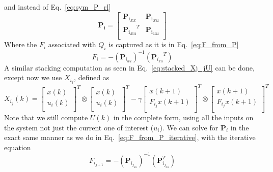 and instead of Eq.~\ref{eq:sym_P_rl}
\begin{equation}
    \textbf{P}_\textbf{i}=\left[\begin{matrix}{\textbf{P}_\textbf{i}}_{xx}&{\textbf{P}_\textbf{i}}_{xu}\\{{\textbf{P}_\textbf{i}}_{xu}}^T&{\textbf{P}_\textbf{i}}_{uu}\\\end{matrix}\right]
    \label{eq:Pi_matrix}
\end{equation}
Where the $F_i$ associated with $Q_i$ is captured as it is in Eq.~\ref{eq:F_from_P}
\begin{equation}
    F_i=-{\left(\textbf{P}_{i_{uu}}\right)}^{-1}\left({\textbf{P}_{i_{xu}}}^T\right)
    \label{eq:Fi_from_Pi}
\end{equation}
A similar stacking computation as seen in Eq.~\ref{eq:stacked_Xj_jU} can be done, except now we use $X_{i_j}$, defined as
\begin{equation}
    X_{i_j}(k)={\left[\begin{matrix}x\left(k\right)\\u_i\left(k\right)\\\end{matrix}\right]}^T\otimes{\left[\begin{matrix}x\left(k\right)\\u_i\left(k\right)\\\end{matrix}\right]}^T-{\gamma\left[\begin{matrix}x\left(k+1\right)\\F_{i_j}x\left(k+1\right)\\\end{matrix}\right]}^T\otimes{\left[\begin{matrix}x\left(k+1\right)\\F_{i_j}x\left(k+1\right)\\\end{matrix}\right]}^T
    \label{eq:Xij}
\end{equation}
Note that we still compute $U\left(k\right)$ in the complete form, using all the inputs on the system not just the current one of interest ($u_i$). We can solve for $\textbf{P}_i$ in the exact same manner as we do in Eq.~\ref{eq:F_from_P_iterative}, with the iterative equation
\begin{equation}
    F_{i_{j+1}}=-{\left(\textbf{P}_{i_{j_{uu}}}\right)}^{-1}\left(\textbf{P}_{i_{j_{xu}}}^T\right)
    \label{eq:Fi_from_Pi_iterative}
\end{equation}


